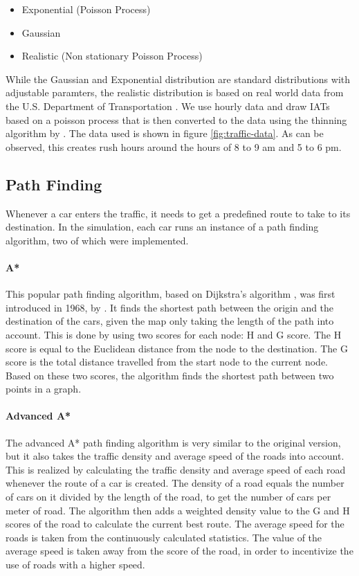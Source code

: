 \documentclass[10pt]{article}
\begin{document}
\begin{itemize}
	\item Exponential (Poisson Process)
	\item Gaussian
	\item Realistic (Non stationary Poisson Process)
\end{itemize}
 
While the Gaussian and Exponential distribution are standard distributions with adjustable paramters, the realistic distribution is based on real world data from the U.S. Department of Transportation \citep{trafficdata}. We use hourly data and draw IATs based on a poisson process that is then converted to the data using the thinning algorithm by \citet{lewis1979simulation}. The data used is shown in figure \ref{fig:traffic-data}. As can be observed, this creates rush hours around the hours of 8 to 9 am and 5 to 6 pm.

\subsection{Path Finding}
Whenever a car enters the traffic, it needs to get a predefined route to take to its destination. In the simulation, each car runs an instance of a path finding algorithm, two of which were implemented.

\paragraph{A*}
This popular path finding algorithm, based on Dijkstra’s algorithm \citep{dijkstra1959note}, was first introduced in 1968, by \citet{hart1968formal}. It finds the shortest path between the origin and the destination of the cars, given the map only taking the length of the path into account. This is done by using two scores for each node: H and G score. The H score is equal to the Euclidean distance from the node to the destination. The G score is the total distance travelled from the start node to the current node. Based on these two scores, the algorithm finds the shortest path between two points in a graph. 

\paragraph{Advanced A*}
The advanced A* path finding algorithm is very similar to the original version, but it also takes the traffic density and average speed of the roads into account. This is realized by calculating the traffic density and average speed of each road whenever the route of a car is created. The density of a road equals the number of cars on it divided by the length of the road, to get the number of cars per meter of road. The algorithm then adds a weighted density value to the G and H scores of the road to calculate the current best route. The average speed for the roads is taken from the continuously calculated statistics. The value of the average speed is taken away from the score of the road, in order to incentivize the use of roads with a higher speed.
\end{document}
